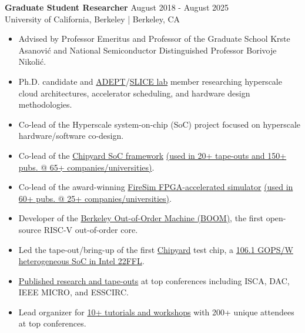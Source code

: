\documentclass[line]{res}
\begin{document}
\begin{resume}
\textbf{Graduate Student Researcher} \hfill August 2018 - August 2025
\\
University of California, Berkeley | Berkeley, CA
\\
\vspace{-3mm}
\begin{itemize}
\item Advised by Professor Emeritus and Professor of the Graduate School Krste Asanovi\'c and National Semiconductor Distinguished Professor Borivoje Nikoli\'c.
\item Ph.D. candidate and \href{https://adept.eecs.berkeley.edu/}{ADEPT}/\href{https://slice.eecs.berkeley.edu/}{SLICE lab} member researching hyperscale cloud architectures, accelerator scheduling, and hardware design methodologies.
\item Co-lead of the Hyperscale system-on-chip (SoC) project focused on hyperscale hardware/software co-design.
\item Co-lead of the \href{https://github.com/ucb-bar/chipyard}{Chipyard SoC framework} \href{https://scholar.google.com/scholar?cites=4549882523608568335&as_sdt=2005&sciodt=0,5&hl=en}{(used in 20+ tape-outs and 150+ pubs. @ 65+ companies/universities)}.
\item Co-lead of the award-winning \href{https://fires.im/}{FireSim FPGA-accelerated simulator} \href{https://fires.im/publications/#userpapers}{(used in 60+ pubs. @ 25+ companies/universities)}.
\item Developer of the \href{https://boom-core.org/}{Berkeley Out-of-Order Machine (BOOM)}, the first open-source RISC-V out-of-order core.
\item Led the tape-out/bring-up of the first \hyperref[sec:chipyard]{Chipyard} test chip, a \href{https://ieeexplore.ieee.org/abstract/document/9567768}{106.1 GOPS/W heterogeneous SoC in Intel 22FFL}.
\item \href{https://scholar.google.com/citations?user=dsAQJ4cAAAAJ&hl=en}{Published research and tape-outs} at top conferences including ISCA, DAC, IEEE MICRO, and ESSCIRC.
\item Lead organizer for \href{https://fires.im/blog/}{10+ tutorials and workshops} with 200+ unique attendees at top conferences.
\end{itemize}

\vspace{-3mm}


\end{resume}
\end{document}
